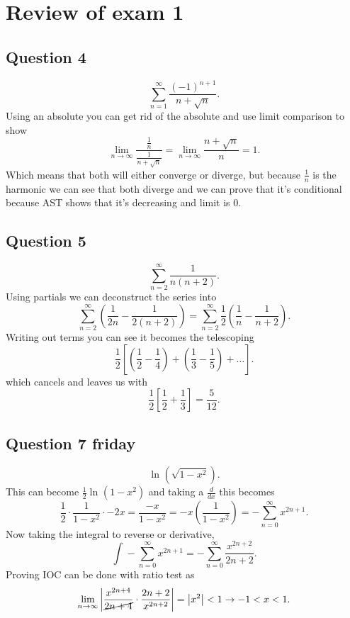 \section{Review of exam 1}%

\label{sec:Review of exam 1}
\subsection{Question 4}%
\label{sub:Question 4}
\[
\sum_{ n=1 } ^{ \infty } \frac{ \left( -1 \right) ^{ n+1 } }{ n+\sqrt{ n} }
.\] 
Using an absolute you can get rid of the absolute and use limit comparison to show 
\[
\lim_{ n \to \infty} \frac{ \frac{ 1 }{ n }  }{ \frac{ 1 }{ n+\sqrt{ n} }  }=\lim_{ n \to \infty} \frac{ n+\sqrt{ n} }{ n }=1
.\] 
Which means that both will either converge or diverge, but because $ \frac{ 1 }{ n }  $ is the harmonic we can see that both diverge and we can prove that it's conditional because AST shows that it's decreasing and limit is 0.
\subsection{Question 5}%
\label{sub:Question 5}
\[
\sum_{ n=2 } ^{ \infty } \frac{ 1 }{ n\left( n+2 \right)  } 
.\] 
Using partials we can deconstruct the series into 
\[
\sum_{ n=2 } ^{ \infty } \left( \frac{ 1 }{ 2n  } - \frac{ 1 }{ 2\left( n+2 \right)  }  \right) = \sum_{ n=2 } ^{ \infty } \frac{ 1 }{ 2 } \left( \frac{ 1 }{ n } -\frac{ 1 }{ n+2 }  \right) 
.\] 
Writing out terms you can see it becomes the telescoping
\[
\frac{ 1 }{ 2 } \left[ \left( \frac{ 1 }{ 2 } -\frac{ 1 }{ 4 }  \right) + \left( \frac{ 1 }{ 3 } -\frac{ 1 }{ 5 }  \right) + \ldots \right] 
.\] 
which cancels and leaves us with
\[
\frac{ 1 }{ 2 } \left[ \frac{ 1 }{ 2 } +\frac{ 1 }{ 3 }  \right] = \frac{ 5 }{ 12 } 
.\] 
\subsection{Question 7 friday}%
\label{sub:Question 7 friday}
\[
\ln^{  } \left( \sqrt{ 1-x^2} \right) 
.\] 
This can become $ \frac{ 1 }{ 2 } \ln^{  } \left( 1-x^2 \right)  $ and taking a $ \frac{ d }{ dx }  $ this becomes
\[
\frac{ 1 }{ 2 } \cdot \frac{ 1 }{ 1-x^2 } \cdot -2x= \frac{ -x }{ 1-x^2 } = -x\left( \frac{ 1 }{ 1-x^2 }  \right) =-\sum_{ n=0 } ^{ \infty } x^{ 2n+1 }
.\] 
Now taking the integral to reverse or derivative,
\[
\int_{  }^{  } -\sum_{ n=0 } ^{ \infty } x^{ 2n+1 }=-\sum_{ n=0 } ^{ \infty } \frac{ x^{ 2n+2 } }{ 2n+2 }
.\] 
Proving IOC can be done with ratio test as
\[
	\lim_{ n \to \infty} \left| \frac{ x^{ 2n+4 } }{ \cancel{ 2n+4 }} \cdot \frac{ 2n+2 }{ x^{ 2n+2 } } \right| = \left| x^2 \right| <1 \to -1<x<1 
.\] 

